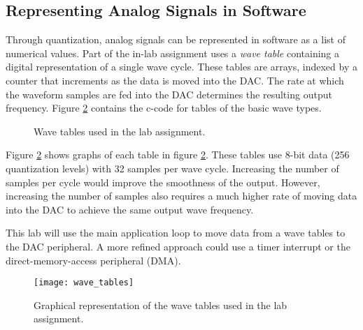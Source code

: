 \documentclass[openany,11pt,fleqn]{book} %
\newcommand{\code}[3]{
    \begin{figure}[]
        \colorbox{gray!20!white}{
            \parbox{\linewidth-2\fboxsep} {
                \centering 
                
            }
        }
        \caption{#2}
        \label{#3}
    \end{figure}
}
\begin{document}
\subsection{Representing Analog Signals in Software} 
 Through quantization, analog signals can be represented in software as a list of numerical values. Part of the in-lab assignment uses a \textit{wave table} containing a digital representation of a single wave cycle. These tables are arrays, indexed by a counter that increments as the data is moved into the DAC. The rate at which the waveform samples are fed into the DAC determines the resulting output frequency. Figure \ref{wave_tables} contains the c-code for tables of the basic wave types.
 
 
%         
% 
 
\code{./Files/wave_tables.c}{Wave tables used in the lab assignment.}{wave_tables}
 
Figure \ref{wave_tables} shows graphs of each table in figure \ref{wave_tables}. These tables use 8-bit data (256 quantization levels) with 32 samples per wave cycle. Increasing the number of samples per cycle would improve the smoothness of the output. However, increasing the number of samples also requires a much higher rate of moving data into the DAC to achieve the same output wave frequency. 

This lab will use the main application loop to move data from a wave tables to the DAC peripheral. A more refined approach could use a timer interrupt or the direct-memory-access peripheral (DMA). 

\begin{figure}[]
    \centering\texttt{[image: wave\_tables]}
    \caption{Graphical representation of the wave tables used in the lab assignment.}
    \label{wave_tables}
\end{figure}
 
\end{document}
